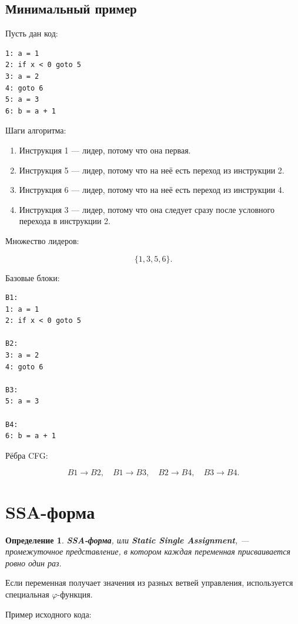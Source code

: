 \documentclass[12pt,a4paper]{article}
\newtheorem{definition}{Определение}
\begin{document}
\subsection{Минимальный пример}

Пусть дан код:

\begin{lstlisting}
1: a = 1
2: if x < 0 goto 5
3: a = 2
4: goto 6
5: a = 3
6: b = a + 1
\end{lstlisting}

Шаги алгоритма:
\begin{enumerate}
    \item Инструкция 1 --- лидер, потому что она первая.
    \item Инструкция 5 --- лидер, потому что на неё есть переход из инструкции 2.
    \item Инструкция 6 --- лидер, потому что на неё есть переход из инструкции 4.
    \item Инструкция 3 --- лидер, потому что она следует сразу после условного перехода в инструкции 2.
\end{enumerate}

Множество лидеров:

\[
\{1,3,5,6\}.
\]

Базовые блоки:

\begin{lstlisting}
B1:
1: a = 1
2: if x < 0 goto 5

B2:
3: a = 2
4: goto 6

B3:
5: a = 3

B4:
6: b = a + 1
\end{lstlisting}

Рёбра CFG:

\[
B1 \to B2,\quad B1 \to B3,\quad B2 \to B4,\quad B3 \to B4.
\]

\section{SSA-форма}

\begin{definition}
\textbf{SSA-форма}, или \textbf{Static Single Assignment}, --- промежуточное представление, в котором каждая переменная присваивается ровно один раз.
\end{definition}

Если переменная получает значения из разных ветвей управления, используется специальная $\varphi$-функция.

Пример исходного кода:
\end{document}

